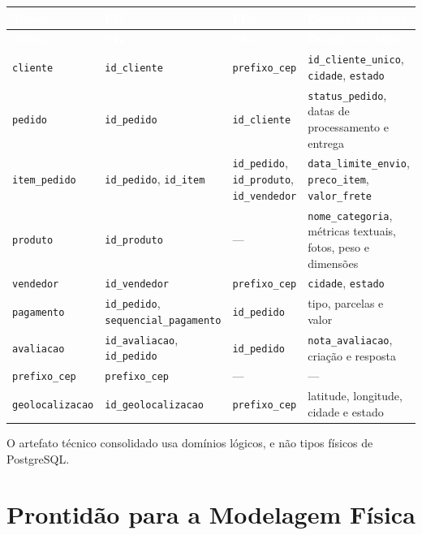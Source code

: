 \documentclass[12pt,a4paper]{article}
\begin{document}
	{\small
		\renewcommand{\arraystretch}{1.25}
		\begin{longtable}{|>{\raggedright\arraybackslash}p{3.2cm}|>{\raggedright\arraybackslash}p{4cm}|>{\raggedright\arraybackslash}p{3cm}|>{\raggedright\arraybackslash}p{3.7cm}|}
			\hline
			\rowcolor{AzulCorporativo}
			\textcolor{white}{\textbf{Tabela}} & \textcolor{white}{\textbf{PK}} & \textcolor{white}{\textbf{FKs}} & \textcolor{white}{\textbf{Demais atributos}} \\ \hline
			\endfirsthead
			\hline
			\rowcolor{AzulCorporativo}
			\textcolor{white}{\textbf{Tabela}} & \textcolor{white}{\textbf{PK}} & \textcolor{white}{\textbf{FKs}} & \textcolor{white}{\textbf{Demais atributos}} \\ \hline
			\endhead
			\texttt{cliente} & \texttt{id\_cliente} & \texttt{prefixo\_cep} & \texttt{id\_cliente\_unico}, \texttt{cidade}, \texttt{estado} \\ \hline
			\texttt{pedido} & \texttt{id\_pedido} & \texttt{id\_cliente} & \texttt{status\_pedido}, datas de processamento e entrega \\ \hline
			\texttt{item\_pedido} & \texttt{id\_pedido}, \texttt{id\_item} & \texttt{id\_pedido}, \texttt{id\_produto}, \texttt{id\_vendedor} & \texttt{data\_limite\_envio}, \texttt{preco\_item}, \texttt{valor\_frete} \\ \hline
			\texttt{produto} & \texttt{id\_produto} & --- & \texttt{nome\_categoria}, métricas textuais, fotos, peso e dimensões \\ \hline
			\texttt{vendedor} & \texttt{id\_vendedor} & \texttt{prefixo\_cep} & \texttt{cidade}, \texttt{estado} \\ \hline
			\texttt{pagamento} & \texttt{id\_pedido}, \texttt{sequencial\_pagamento} & \texttt{id\_pedido} & tipo, parcelas e valor \\ \hline
			\texttt{avaliacao} & \texttt{id\_avaliacao}, \texttt{id\_pedido} & \texttt{id\_pedido} & \texttt{nota\_avaliacao}, criação e resposta \\ \hline
			\texttt{prefixo\_cep} & \texttt{prefixo\_cep} & --- & --- \\ \hline
			\texttt{geolocalizacao} & \texttt{id\_geolocalizacao} & \texttt{prefixo\_cep} & latitude, longitude, cidade e estado \\ \hline
	\end{longtable}}

	O artefato técnico consolidado usa domínios lógicos, e não tipos físicos de
	PostgreSQL.
	\section{Prontidão para a Modelagem Física}
\end{document}
